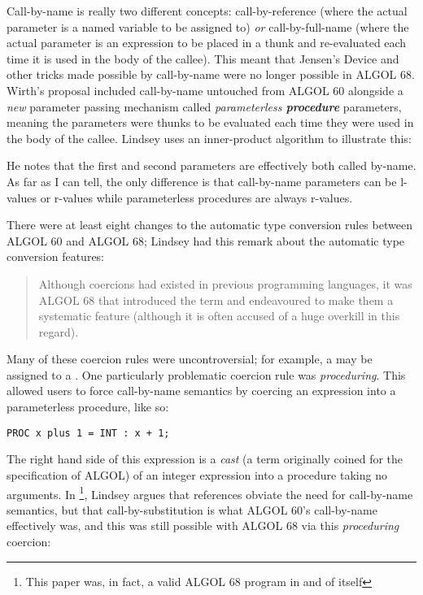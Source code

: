 Call-by-name is really two different concepts:
call-by-reference (where the actual parameter is a named variable to
be assigned to) \textit{or} call-by-full-name (where the actual parameter
is an expression to be placed in a thunk and re-evaluated each time
it is used in the body of the callee). This meant that Jensen's Device
and other tricks made possible by call-by-name were no longer possible
in ALGOL 68.
Wirth's proposal included call-by-name untouched from ALGOL 60 alongside
a \textit{new} parameter passing mechanism called \textit{parameterless \textbf{procedure}}
parameters, meaning the parameters were thunks to be evaluated each time they
were used in the body of the callee\cite{a_history_of_algol_68_1993}.
Lindsey uses an inner-product algorithm to illustrate this:



He notes that the first and second parameters are effectively both called by-name.
As far as I can tell, the only difference is that call-by-name parameters can
be \gls{l-value}s or \gls{r-value}s while parameterless procedures are always r-values.

There were at least eight changes to the automatic type conversion rules
between ALGOL 60 and ALGOL 68;
Lindsey had this remark about the automatic type conversion features:
\begin{quotation}
	Although coercions had existed in previous programming languages, it was ALGOL
	68 that introduced the term and endeavoured to make them a systematic feature
	(although it is often accused of a huge overkill in this regard).
\end{quotation}

Many of these coercion rules were uncontroversial; for example, a 
may be assigned to a .
One particularly problematic coercion rule was \textit{proceduring}.
This allowed users to force call-by-name semantics by coercing an expression
into a parameterless procedure, like so:

\begin{lstlisting}[language=algol,frame=single]
      PROC x plus 1 = INT : x + 1;
\end{lstlisting}

The right hand side of this expression is a \textit{cast}
(a term originally coined for the specification of ALGOL)
of an integer expression into a procedure taking no arguments.
In 
\footnote{This paper was, in fact, a valid ALGOL 68 program in and of itself},
Lindsey argues that references
obviate the need for call-by-name semantics, but that call-by-substitution is what
ALGOL 60's call-by-name effectively was, and this was still possible with ALGOL 68
via this \textit{proceduring} coercion:

